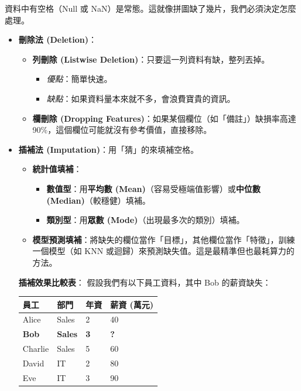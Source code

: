 \documentclass[
  letterpaper,
  DIV=11,
  numbers=noendperiod]{scrreprt}
\providecommand{\tightlist}{%
  \setlength{\itemsep}{0pt}\setlength{\parskip}{0pt}}
\begin{document}
資料中有空格（Null 或
NaN）是常態。這就像拼圖缺了幾片，我們必須決定怎麼處理。

\begin{itemize}
\item
  \textbf{刪除法 (Deletion)}：

  \begin{itemize}
  \tightlist
  \item
    \textbf{列刪除 (Listwise Deletion)}：只要這一列資料有缺，整列丟掉。

    \begin{itemize}
    \tightlist
    \item
      \emph{優點}：簡單快速。
    \item
      \emph{缺點}：如果資料量本來就不多，會浪費寶貴的資訊。
    \end{itemize}
  \item
    \textbf{欄刪除 (Dropping
    Features)}：如果某個欄位（如「備註」）缺損率高達
    90\%，這個欄位可能就沒有參考價值，直接移除。
  \end{itemize}
\item
  \textbf{插補法 (Imputation)}：用「猜」的來填補空格。

  \begin{itemize}
  \tightlist
  \item
    \textbf{統計值填補}：

    \begin{itemize}
    \tightlist
    \item
      \textbf{數值型}：用\textbf{平均數
      (Mean)}（容易受極端值影響）或\textbf{中位數
      (Median)}（較穩健）填補。
    \item
      \textbf{類別型}：用\textbf{眾數 (Mode)}（出現最多次的類別）填補。
    \end{itemize}
  \item
    \textbf{模型預測填補}：將缺失的欄位當作「目標」，其他欄位當作「特徵」，訓練一個模型（如
    KNN 或迴歸）來預測缺失值。這是最精準但也最耗算力的方法。
  \end{itemize}

  \textbf{插補效果比較表}： 假設我們有以下員工資料，其中 Bob
  的薪資缺失：

  \begin{longtable}[]{@{}llll@{}}
  \toprule\noalign{}
  員工 & 部門 & 年資 & 薪資 (萬元) \\
  \midrule\noalign{}
  \endhead
  \bottomrule\noalign{}
  \endlastfoot
  Alice & Sales & 2 & 40 \\
  \textbf{Bob} & \textbf{Sales} & \textbf{3} & \textbf{?} \\
  Charlie & Sales & 5 & 60 \\
  David & IT & 2 & 80 \\
  Eve & IT & 3 & 90 \\
  \end{longtable}


\end{itemize}
\end{document}
